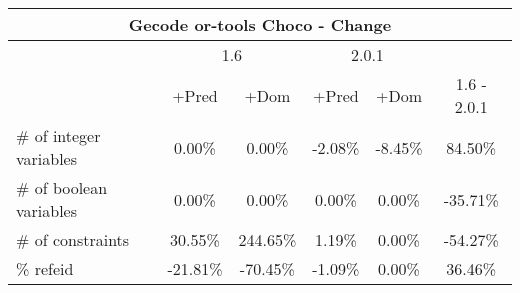 \documentclass{standalone}
\begin{document}
\begin{table}[H]
\footnotesize
\begin{tabular}{lc|c|c|c|c}
\multicolumn{6}{c}{Gecode or-tools Choco - Change} \\ 
\hline\hline  & \multicolumn{2}{c|}{1.6} &\multicolumn{2}{c|}{2.0.1} &\\ 
\hline  & +Pred & +Dom & +Pred & +Dom & 1.6 - 2.0.1\\
\# of integer variables & 0.00\% & 0.00\% & -2.08\% & -8.45\% & 84.50\% \\ 
\# of boolean variables & 0.00\% & 0.00\% & 0.00\% & 0.00\% & -35.71\% \\ 
\# of constraints       & 30.55\% & 244.65\% & 1.19\% & 0.00\% & -54.27\% \\ 
\% refeid               & -21.81\% & -70.45\% & -1.09\% & 0.00\% & 36.46\%\\ 
\end{tabular} 
\end{table}
\end{document}
